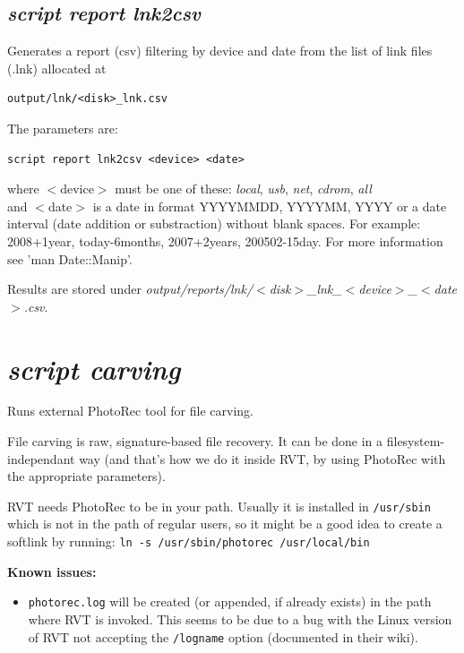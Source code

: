 \documentclass[a4paper,11pt,oneside]{report}
\begin{document}
\subsection{\emph{script report lnk2csv}}

Generates a report (csv) filtering by device and date from the list of link files (.lnk) allocated at
\begin{verbatim}
output/lnk/<disk>_lnk.csv
\end{verbatim}

The parameters are:
\begin{verbatim}
script report lnk2csv <device> <date>
\end{verbatim}
where $<$device$>$ must be one of these: \emph{local}, \emph{usb}, \emph{net}, \emph{cdrom}, \emph{all}\\
and $<$date$>$ is a date in format YYYYMMDD, YYYYMM, YYYY or a date interval (date addition or substraction) without blank spaces. 
For example: 2008+1year, today-6months, 2007+2years, 200502-15day. For more information  see 'man Date::Manip'.

Results are stored under \emph{output/reports/lnk/$<$disk$>$\_lnk\_$<$device$>$\_$<$date$>$.csv}.




\section{\emph{script carving}}

Runs external PhotoRec tool for file carving.

File carving is raw, signature-based file recovery. It can be done in a filesystem-independant way (and that's how we do it inside RVT, by using PhotoRec with the appropriate parameters).

RVT needs PhotoRec to be in your path. Usually it is installed in \texttt{/usr/sbin} which is not in the path of regular users, so  it might be a good idea to create a softlink by running: \texttt{ln -s /usr/sbin/photorec /usr/local/bin}

\textbf{Known issues:}
\begin{itemize}
	\item \texttt{photorec.log} will be created (or appended, if already exists) in the path where RVT is invoked. This seems to be due to a bug with the Linux version of RVT not accepting the \texttt{/logname} option (documented in their wiki).
\end{itemize}
\end{document}
